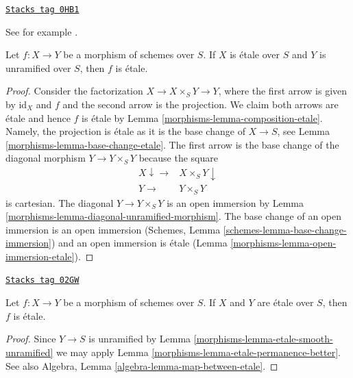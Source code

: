 \begin{lemma}
\label{morphisms-lemma-etale-permanence-better}
\href{https://stacks.math.columbia.edu/tag/0HB1}{\texttt{Stacks tag 0HB1}}

\begin{reference}
See for example \cite[Remark 18.30 (2).]{GWII}.
\end{reference}
Let $f : X \to Y$ be a morphism of schemes over $S$.
If $X$ is \'etale over $S$ and $Y$ is unramified over $S$, then
$f$ is \'etale.
\end{lemma}

\begin{proof}

Consider the factorization $X \to X \times_S Y \to Y$, where the first arrow
is given by $\text{id}_X$ and $f$ and the second arrow is the projection.
We claim both arrows are \'etale and hence $f$ is \'etale by
Lemma \ref{morphisms-lemma-composition-etale}. Namely, the projection is \'etale
as it is the base change of $X \to S$, see Lemma \ref{morphisms-lemma-base-change-etale}.
The first arrow is the base change of the diagonal morphism
$Y \to Y \times_S Y$ because the square
$$
\begin{array}{cc}X \downarrow\longrightarrow & X \times_S Y \downarrow \\ Y \longrightarrow & Y \times_S Y\end{array}
$$
is cartesian. The diagonal $Y \to Y \times_S Y$ is an open immersion by
Lemma \ref{morphisms-lemma-diagonal-unramified-morphism}. The base change
of an open immersion is an open immersion
(Schemes, Lemma \ref{schemes-lemma-base-change-immersion})
and an open immersion is \'etale
(Lemma \ref{morphisms-lemma-open-immersion-etale}).
\end{proof}

\begin{lemma}
\label{morphisms-lemma-etale-permanence}
\href{https://stacks.math.columbia.edu/tag/02GW}{\texttt{Stacks tag 02GW}}


Let $f : X \to Y$ be a morphism of schemes over $S$.
If $X$ and $Y$ are \'etale over $S$, then
$f$ is \'etale.
\end{lemma}

\begin{proof}

Since $Y \to S$ is unramified by Lemma \ref{morphisms-lemma-etale-smooth-unramified}
we may apply Lemma \ref{morphisms-lemma-etale-permanence-better}. See also
Algebra, Lemma \ref{algebra-lemma-map-between-etale}.
\end{proof}

